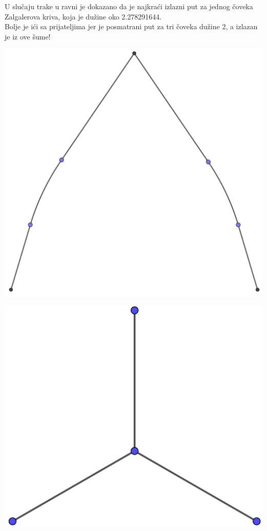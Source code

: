 \documentclass[b1paper,portrait]{template/baposter}
\begin{document}
\begin{poster}
{
	
	\hspace{10pt} U slu\v caju trake u ravni je dokazano da je najkra\' ci izlazni  put za jednog \v coveka Zalgalerova kriva, koja je du\v zine oko 2.278291644. 
	\\ 
 \hphantom{sdff}Bolje je i\' ci sa prijateljima jer je posmatrani put za tri \v coveka du\v zine 2, a izlazan je iz ove \v sume!
	\begin{center}
\begin{minipage}{0.25\linewidth}
\includegraphics[width=\linewidth]{zalgaller}
\end{minipage}%
\hspace{30pt}
\begin{minipage}{0.25\linewidth}
\includegraphics[width=\linewidth]{Y}

\end{minipage}
\end{center}}
\end{poster}
\end{document}
